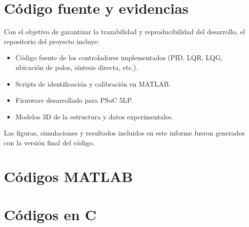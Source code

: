 \onecolumn
\appendices

\section{Código fuente y evidencias}

Con el objetivo de garantizar la trazabilidad y reproducibilidad del desarrollo,
el repositorio del proyecto incluye:

\begin{itemize}
	\item Código fuente de los controladores implementados (PID, LQR, LQG, ubicación de polos, síntesis directa, etc.).
	\item Scripts de identificación y calibración en MATLAB.
	\item Firmware desarrollado para PSoC 5LP.
	\item Modelos 3D de la estructura y datos experimentales.
\end{itemize}

Las figuras, simulaciones y resultados incluidos en este informe fueron generados con la versión final del código.

\section{Códigos  MATLAB}






\section{Códigos en C}

\twocolumn



